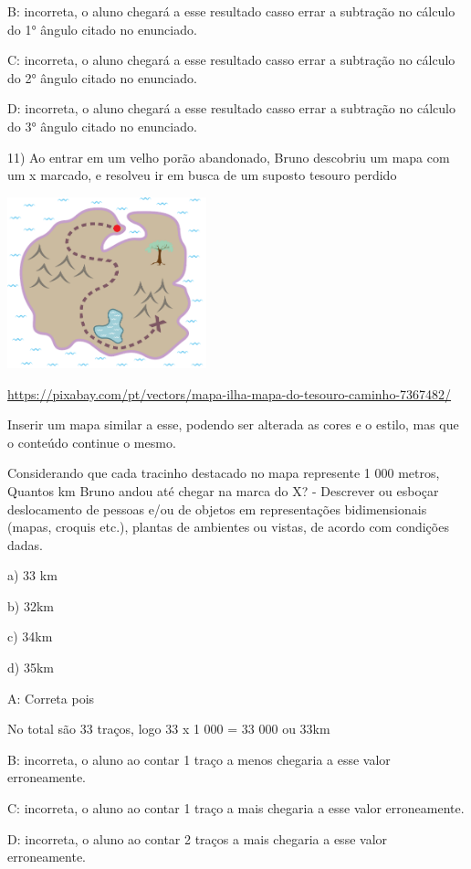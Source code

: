 {B: incorreta, o aluno chegará a esse resultado casso errar a subtração
no cálculo do 1° ângulo citado no enunciado.

C: incorreta, o aluno chegará a esse resultado casso errar a subtração
no cálculo do 2° ângulo citado no enunciado.

D: incorreta, o aluno chegará a esse resultado casso errar a subtração
no cálculo do 3° ângulo citado no enunciado.

11) Ao entrar em um velho porão abandonado, Bruno descobriu um mapa com
um x marcado, e resolveu ir em busca de um suposto tesouro perdido

\includegraphics[width=2.27099in,height=1.95in]{./imgSAEB_8_MAT/media/image61.png}

\url{https://pixabay.com/pt/vectors/mapa-ilha-mapa-do-tesouro-caminho-7367482/}

Inserir um mapa similar a esse, podendo ser alterada as cores e o
estilo, mas que o conteúdo continue o mesmo.

Considerando que cada tracinho destacado no mapa represente 1 000
metros, Quantos km Bruno andou até chegar na marca do X? - Descrever ou
esboçar deslocamento de pessoas e/ou de objetos em representações
bidimensionais (mapas, croquis etc.), plantas de ambientes ou vistas, de
acordo com condições dadas.

a) 33 km

b) 32km

c) 34km

d) 35km

A: Correta pois

No total são 33 traços, logo 33 x 1 000 = 33 000 ou 33km

B: incorreta, o aluno ao contar 1 traço a menos chegaria a esse valor
erroneamente.

C: incorreta, o aluno ao contar 1 traço a mais chegaria a esse valor
erroneamente.

D: incorreta, o aluno ao contar 2 traços a mais chegaria a esse valor
erroneamente.

}
